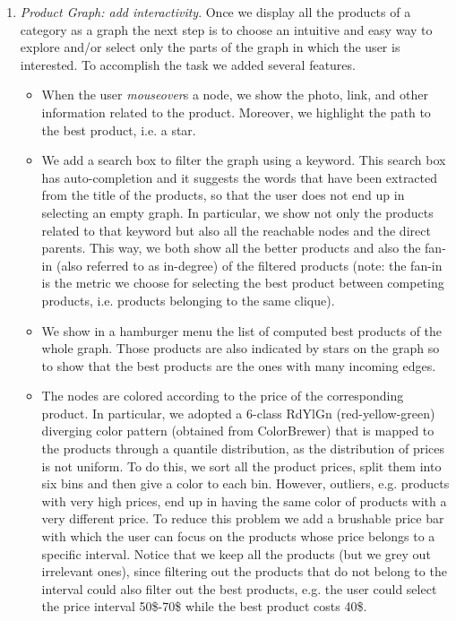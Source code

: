 \documentclass[a4paper,12pt]{article}
\begin{document}
\begin{enumerate}
	\item \textit{Product Graph: add interactivity}. Once we display all the products of a category as a graph the next step is to choose an intuitive and easy way to explore and/or select only the parts of the graph in which the user is interested. To accomplish the task we added several features.
		\begin{itemize}
			\item When the user \emph{mouseover}s a node, we show the photo, link, and other information related to the product. Moreover, we highlight the path to the best product, i.e. a star.
			\item We add a search box to filter the graph using a keyword. This search box has auto-completion and it suggests the words that have been extracted from the title of the products, so that the user does not end up in selecting an empty graph. In particular, we show not only the products related to that keyword but also all the reachable nodes and the direct parents. This way, we both show all the better products and also the fan-in (also referred to as in-degree) of the filtered products (note: the fan-in is the metric we choose for selecting the best product between competing products, i.e. products belonging to the same clique).
			\item We show in a hamburger menu the list of computed best products of the whole graph. Those products are also indicated by stars on the graph so to show that the best products are the ones with many incoming edges.
			\item The nodes are colored according to the price of the corresponding product. In particular, we adopted a 6-class RdYlGn (red-yellow-green) diverging color pattern (obtained from ColorBrewer) that is mapped to the products through a quantile distribution, as the distribution of prices is not uniform.
			To do this, we sort all the product prices, split them into six bins and then give a color to each bin. However, outliers, e.g. products with very high prices, end up in having the same color of products with a very different price. To reduce this problem we add a brushable price bar with which the user can focus on the products whose price belongs to a specific interval. Notice that we keep all the products (but we grey out irrelevant ones), since filtering out the products that do not belong to the interval could also filter out the best products, e.g. the user could select the price interval 50\$-70\$ while the best product costs 40\$. 
		\end{itemize}


\end{enumerate}
\end{document}
